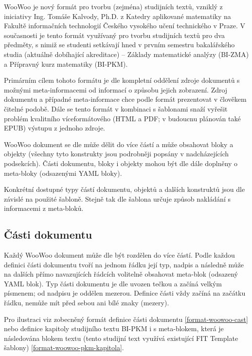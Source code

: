 WooWoo je nový formát pro tvorbu (zejména) studijních textů, vzniklý z iniciativy Ing. Tomáše Kalvody, Ph.D. z Katedry
aplikované matematiky na Fakultě informačních technologií Českého vysokého učení technického v Praze. V současnosti je
tento formát využívaný pro tvorbu studijních textů pro dva předměty, s nimiž se studenti setkávají hned v prvním
semestru bakalářského studia (aktuálně dobíhající akreditace) – Základy matematické analýzy (BI-ZMA) a Přípravný kurz
matematiky (BI-PKM).

Primárním cílem tohoto formátu je dle \cite{woowoo} kompletní oddělení zdroje dokumentů s možnými meta-informacemi od
informací o způsobu jejich zobrazení. Zdroj dokumentu a případné meta-informace chce podle \cite{woowoo} formát
prezentovat v člověkem čitelné podobě. Dále se tento formát v kombinaci s šablonami snaží vyřešit problém kvalitního
víceformátového (HTML a PDF; v budoucnu plánován také EPUB) výstupu z jednoho zdroje.

WooWoo dokument se dle \cite{woowoo} může dělit do více částí a může obsahovat bloky a objekty (všechny tyto konstrukty
jsou podrobněji popsány v nadcházejících podsekcích). Části dokumentu, bloky i objekty mohou být dle \cite{woowoo} dále
doplněny o meta-bloky (odsazenými YAML bloky).

Konkrétní dostupné typy částí dokumentu, objektů a dalších konstruktů jsou dle \cite{woowoo} závislé na použité šabloně.
Stejně tak dle \cite{woowoo} šablona určuje způsob nakládání s informacemi z meta-bloků.

\subsection{Části dokumentu}

Každý WooWoo dokument může dle \cite{woowoo} být rozdělen do více částí. Podle \cite{woowoo} každou definici části
dokumentu tvoří na jednom řádku její typ, nadpis a následně může na dalších přímo navazujících řádcích volitelně
obsahovat meta-blok (odsazený YAML blok). Typ části dokumentu je dle \cite{woowoo} uvozen tečkou a začíná velkým
písmenem; od nadpisu je oddělen mezerou. Definice části vždy začíná na začátku řádku, nemůže mít před sebou ani bílé
znaky (mezery).

Pro ilustraci viz zobecněný formát definice části dokumentu \ref{format-woowoo-cast} nebo definice kapitoly studijního
textu BI-PKM i s meta-blokem, která je následována blokem textu (tento studijní text využívá existující FIT Template
šablony) \ref{format-woowoo-pkm-kapitola}.

